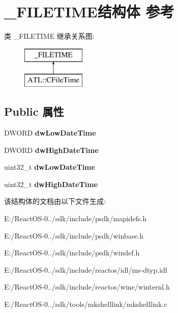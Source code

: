 \hypertarget{struct___f_i_l_e_t_i_m_e}{}\section{\+\_\+\+F\+I\+L\+E\+T\+I\+M\+E结构体 参考}
\label{struct___f_i_l_e_t_i_m_e}
类 \+\_\+\+F\+I\+L\+E\+T\+I\+ME 继承关系图\+:\begin{figure}[H]
\begin{center}
\leavevmode
\includegraphics[height=2.000000cm]{struct___f_i_l_e_t_i_m_e}
\end{center}
\end{figure}
\subsection*{Public 属性}
\begin{DoxyCompactItemize}
\item 
\mbox{\label{struct___f_i_l_e_t_i_m_e_a676f2b504f2b913602054b4e74817487}} 
D\+W\+O\+RD {\bfseries dw\+Low\+Date\+Time}
\item 
\mbox{\label{struct___f_i_l_e_t_i_m_e_a5dc60fe577a4f1b55f96b2da3e4c9361}} 
D\+W\+O\+RD {\bfseries dw\+High\+Date\+Time}
\item 
\mbox{\label{struct___f_i_l_e_t_i_m_e_ab1eab145152f46abb31b795c85c439cc}} 
uint32\+\_\+t {\bfseries dw\+Low\+Date\+Time}
\item 
\mbox{\label{struct___f_i_l_e_t_i_m_e_a7d565737969446ed0cb59bc236588b40}} 
uint32\+\_\+t {\bfseries dw\+High\+Date\+Time}
\end{DoxyCompactItemize}


该结构体的文档由以下文件生成\+:\begin{DoxyCompactItemize}
\item 
E\+:/\+React\+O\+S-\/0../sdk/include/psdk/mapidefs.\+h\item 
E\+:/\+React\+O\+S-\/0../sdk/include/psdk/winbase.\+h\item 
E\+:/\+React\+O\+S-\/0../sdk/include/psdk/windef.\+h\item 
E\+:/\+React\+O\+S-\/0../sdk/include/reactos/idl/ms-\/dtyp.\+idl\item 
E\+:/\+React\+O\+S-\/0../sdk/include/reactos/wine/winternl.\+h\item 
E\+:/\+React\+O\+S-\/0../sdk/tools/mkshelllink/mkshelllink.\+c\end{DoxyCompactItemize}
